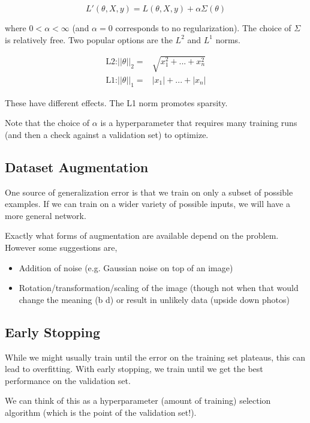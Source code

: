 \documentclass{article}
\begin{document}
$$
L'(\theta, X, y) = L(\theta, X, y) + \alpha \Sigma(\theta)
$$

\noindent
where $0 < \alpha < \infty$ (and $\alpha = 0$ corresponds to no regularization).
The choice of $\Sigma$ is relatively free.
Two popular options are the $L^2$ and $L^1$ norms.

\begin{align}
    \text{L2:} || \theta ||_2 =& \sqrt{x_1^2 + ... + x_n^2} \\
    \text{L1:} || \theta ||_1 =& | x_1 | + ... + | x_n |
\end{align}

These have different effects. The L1 norm promotes sparsity.

Note that the choice of $\alpha$ is a hyperparameter that requires many training runs (and then a check against a validation set) to optimize.

\subsection{Dataset Augmentation}

One source of generalization error is that we train on only a subset of possible examples. If we can train on a wider variety of possible inputs, we will have a more general network.

Exactly what forms of augmentation are available depend on the problem. However some suggestions are,

\begin{itemize}
    \item Addition of noise (e.g. Gaussian noise on top of an image)
    \item Rotation/transformation/scaling of the image (though not when that would change the meaning (b d) or result in unlikely data (upside down photos)
\end{itemize}


\subsection{Early Stopping}

While we might usually train until the error on the training set plateaus, this can lead to overfitting. With early stopping, we train until we get the best performance on the validation set.

We can think of this as a hyperparameter (amount of training) selection algorithm (which is the point of the validation set!).
\end{document}
